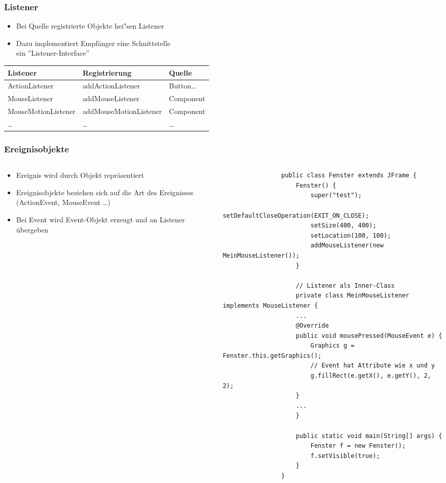 \begin{frame}[fragile]
	\frametitle{Listener}
	\begin{itemize}
	  \item Bei Quelle registrierte Objekte hei"sen Listener
	  \item Dazu implementiert Empf\"anger eine Schnittstelle\\
	  ein ''Listener-Interface''
	\end{itemize}
	\small
	\begin{table}
	\begin{tabular}{l|l|l}
	Listener & Registrierung & Quelle\\ \hline
			ActionListener & addActionListener & Button\ldots\\
			MouseListener & addMouseListener & Component\\
			MouseMotionListener & addMouseMotionListener & Component\\
			\ldots & \ldots & \ldots
	\end{tabular}
	\end{table}
\end{frame} 

\begin{frame}[fragile]
	\frametitle{Ereignisobjekte}
	\begin{columns}
		\begin{column}{0.4\textwidth}
			\small
			\begin{itemize}
			  \item Ereignis wird durch Objekt repr\"asentiert
			  \item Ereignisobjekte beziehen sich auf die Art 
			  des Ereignisses (ActionEvent, MouseEvent \ldots)
			  \item Bei Event wird Event-Objekt erzeugt und an
			  Listener \"ubergeben
			\end{itemize}
		\end{column}
		\begin{column}{0.6\textwidth}
			\begin{lstlisting}
				public class Fenster extends JFrame {
					Fenster() {
						super("test");
						setDefaultCloseOperation(EXIT_ON_CLOSE);
						setSize(400, 400);
						setLocation(100, 100);
						addMouseListener(new MeinMouseListener());
					}
									
					// Listener als Inner-Class
					private class MeinMouseListener implements MouseListener {
					...
					@Override
					public void mousePressed(MouseEvent e) {
						Graphics g = Fenster.this.getGraphics();
						// Event hat Attribute wie x und y						   
						g.fillRect(e.getX(), e.getY(), 2, 2);
					}
					...
					}
									
					public static void main(String[] args) {
						Fenster f = new Fenster();
						f.setVisible(true);
					}
				}
			\end{lstlisting}
		\end{column}
	\end{columns}
\end{frame}

